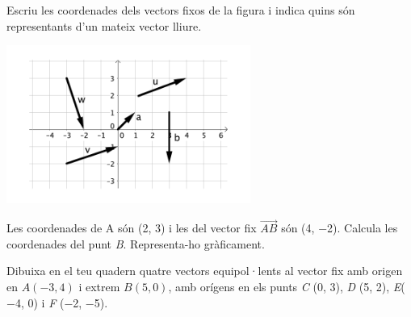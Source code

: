 \begin{mylist}
\vspace{-1.8cm}
\exer \begin{minipage}[t]{0.5\textwidth}
	Escriu les coordenades dels vectors fixos de la figura i indica quins són representants d'un mateix vector lliure.
\end{minipage}
\begin{minipage}{0.5\textwidth}
	\centering
	\vspace{1.5cm}
	\includegraphics[width=0.6\textwidth]{img-10/vectors}
\end{minipage}


 \exer  Les coordenades de A són (2, 3) i les del vector fix $\overrightarrow{AB}$ són (4, $-$2). Calcula les coordenades del punt \textit{B}. Representa-ho gràficament.

\exer  Dibuixa en el teu quadern quatre vectors equipol·lents al vector fix amb origen en  $A( -3, 4)$ i extrem $B(5, 0)$, amb orígens en els punts \textit{C} (0, 3), \textit{D} (5, 2), \textit{E}($-$4, 0) i \linebreak \textit{F} ($-$2, $-$5). 




\end{mylist}
